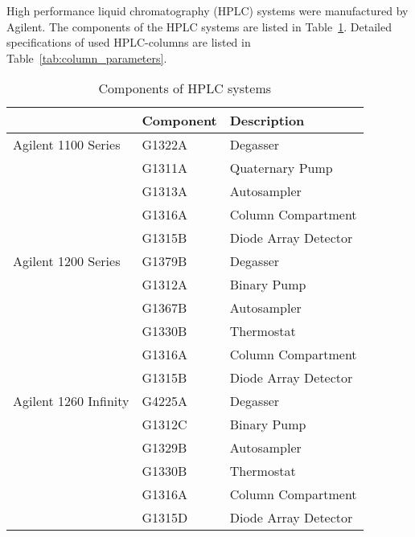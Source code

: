 	High performance liquid chromatography (HPLC) systems were manufactured by Agilent. The components of the HPLC systems are listed in Table~\ref{tab:HPLCtab}. Detailed specifications of used HPLC-columns are listed in Table~\ref{tab:column_parameters}.

	\begin{table}[htbp]
		\caption{Components of HPLC systems}
		\label{tab:HPLCtab}
		\centering
		\begin{tabularx}{\textwidth}{XXX}
			\toprule
							& \textbf{Component}		& \textbf{Description}	\\
			\midrule
			Agilent 1100 Series		&	G1322A		&	Degasser			\\
									&	G1311A		&	Quaternary Pump		\\
									&	G1313A		&	Autosampler			\\
									&	G1316A		&	Column Compartment	\\
									&	G1315B		&	Diode Array Detector	\\
			\midrule
			Agilent 1200 Series		&	G1379B		&	Degasser			\\
									&	G1312A		&	Binary Pump			\\
									&	G1367B		&	Autosampler			\\
									&	G1330B		&	Thermostat			\\
									&	G1316A		&	Column Compartment	\\
									&	G1315B		&	Diode Array Detector	\\
			\midrule
			Agilent 1260 Infinity	&	G4225A		&	Degasser			\\
									&	G1312C		&	Binary Pump			\\
									&	G1329B		&	Autosampler			\\
									&	G1330B		&	Thermostat			\\
									&	G1316A		&	Column Compartment	\\
									&	G1315D		&	Diode Array Detector	\\
			\bottomrule
		\end{tabularx}
	\end{table}


